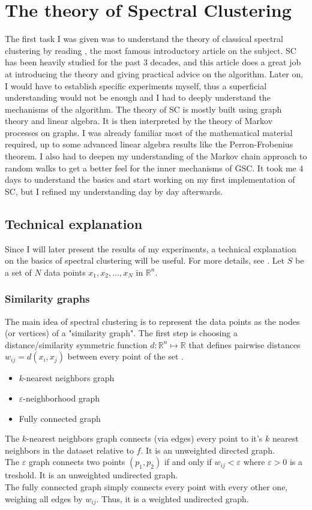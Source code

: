 \documentclass[a4paper,12pt]{article}
\theoremstyle{definition}
\theoremstyle{plain}
\def\R{\mathbb{R}}%
\begin{document}
\section{The theory of Spectral Clustering}
The first task I was given was to understand the theory of classical spectral clustering by reading \cite[A tutorial on Spectral Clustering]{tutorial}, the most famous introductory article on the subject. SC has been heavily studied for the past $3$ decades, and this article does a great job at introducing the theory and giving practical advice on the algorithm. Later on, I would have to establish specific experiments myself, thus a superficial understanding would not be enough and I had to deeply understand the mechanisms of the algorithm. The theory of SC is mostly built using graph theory and linear algebra. It is then interpreted by the theory of Markov processes on graphs. I was already familiar most of the mathematical material required, up to some advanced linear algebra results like the Perron-Frobenius theorem. I also had to deepen my understanding of the Markov chain approach to random walks to get a better feel for the inner mechanisms of GSC.
It took me $4$ days to understand the basics and start working on my first implementation of SC, but I refined my understanding day by day afterwards.
\subsection{Technical explanation} \label{sec-theory}
Since I will later present the results of my experiments, a technical explanation on the basics of spectral clustering will be useful. For more details, see \cite{tutorial}.
Let $S$ be a set of $N$ data points $x_1,x_2, \ldots ,x_N$ in $\R^n$.
\subsubsection{Similarity graphs}
The main idea of spectral clustering is to represent the data points as the nodes (or vertices) of a "similarity graph". The first step is choosing a distance/similarity symmetric function $d: \R^n \mapsto \R$ that defines pairwise distances $w_{ij} = d(x_i,x_j)$ between every point of the set .

\begin{itemize}
	\item $k$-nearest neighbors graph
	\item $\varepsilon$-neighborhood graph
	\item Fully connected graph
\end{itemize}
The $k$-nearest neighbors graph connects (via edges) every point to it's $k$ nearest neighbors in the dataset relative to $f$. It is an unweighted directed graph. \\
The $\varepsilon$ graph connects two points $(p_1,p_2)$ if and only if $w_{ij} < \varepsilon$ where $\varepsilon > 0$  is a treshold. It is an unweighted undirected graph. \\
The fully connected graph simply connects every point with every other one, weighing all edges by $w_{ij}$. Thus, it is a weighted undirected graph. \\
\end{document}
